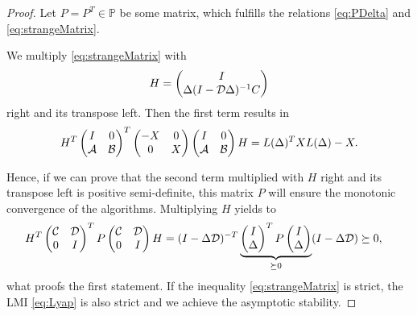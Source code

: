 \begin{proof}	
	Let $P = P^T \in \mathbb{P}$ be some matrix, which fulfills the relations \eqref{eq:PDelta} and \eqref{eq:strangeMatrix}.
	
	We multiply \eqref{eq:strangeMatrix} with 
	\begin{align}
		H = \begin{pmatrix}
			I \\ \Delta ( I - \mathcal{D} \Delta)^{-1}C
		\end{pmatrix}
	\end{align}	
right and its transpose left. Then the first term results in 
\begin{align}
H^T
\begin{pmatrix}
I & 0 \\ \mathcal{A} &  \mathcal{B}
\end{pmatrix}^T
\begin{pmatrix}
-X & 0 \\ 0 & X
\end{pmatrix} 
\begin{pmatrix}
I & 0 \\ \mathcal{A} &  \mathcal{B}
\end{pmatrix} H 
= L(\Delta)^T X L(\Delta) - X.
\end{align}
	
	Hence, if we can prove that the second term multiplied with $H$ right and its transpose left is positive semi-definite, this matrix $P$ will ensure the monotonic convergence of the algorithms. Multiplying $H$ yields to
	\begin{align*}
	&H^T\begin{pmatrix}
	\mathcal{C} & \mathcal{D} \\ 0 & I
	\end{pmatrix}^T
	P
	\begin{pmatrix}
	\mathcal{C} & \mathcal{D} \\ 0 & I
	\end{pmatrix} H  = 
	(I - \Delta \mathcal{D})^{-T} \underbrace{\begin{pmatrix}
		I \\ \Delta 
		\end{pmatrix}^T P
		\begin{pmatrix}
		I \\ \Delta 
		\end{pmatrix}}_{\succeq 0}(I - \Delta \mathcal{D})
	\succeq 0,
	\end{align*}
	what proofs the first statement. 
	If the inequality \eqref{eq:strangeMatrix} is strict, the LMI \eqref{eq:Lyap} is also strict and we achieve the asymptotic stability. 
\end{proof}



